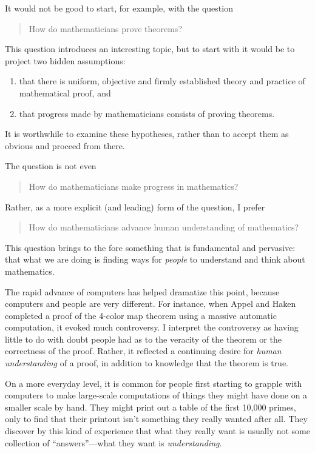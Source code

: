 \documentclass[12pt,oneside]{amsart}
\begin{document}
It would not be good to start, for example, with the 
question
\begin{quotation}
How do mathematicians prove theorems?
\end{quotation}  
This question introduces an interesting topic, but 
to start with it would be to project two hidden assumptions:
\begin{enumerate}  
\item that there is uniform, objective and firmly 
established theory and practice of mathematical proof, and
\item that progress made by mathematicians consists of 
proving 
theorems. \end{enumerate}
It is worthwhile to examine these hypotheses, rather than 
to accept
them as obvious and proceed from there.

The question is not even
\begin{quote}
How do mathematicians make progress in mathematics?
\end{quote} 
Rather, as a more explicit (and leading) form of the 
question, I prefer
\begin{quote}
How do mathematicians advance human understanding of 
mathematics?
\end{quote}

This question brings to the fore something that is
fundamental and pervasive: that what we are doing is finding
ways for {\it people} to understand and think about 
mathematics.

The rapid advance of computers has helped 
dramatize this point, because computers and people are 
very different.
For instance, when Appel and Haken completed a proof of 
the 4-color 
map theorem using a massive automatic computation, it 
evoked much controversy.
I interpret the controversy as having
little to do with doubt people had as to the veracity 
of the theorem or the correctness of the proof.  Rather, 
it reflected a 
continuing desire for {\it human understanding} of a 
proof, in addition
to knowledge that the theorem is true.

On a more everyday level, it is common for people first 
starting to 
grapple with computers to make large-scale computations
of things they  might have done on a smaller scale by hand.
They might print out a table of the first 10,000 primes,
only to find that their printout isn't 
something they really wanted after all.  They discover by 
this kind of
experience that what they really want is usually not some
collection of ``answers''---what they want is {\it 
understanding}. 
\end{document}
